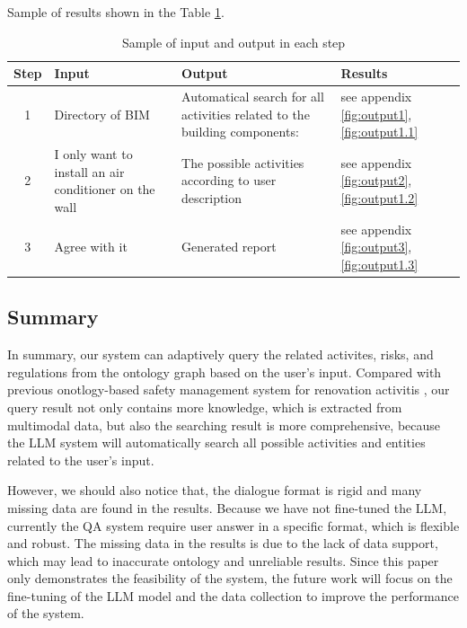 Sample of results shown in the Table  \ref{tab:input_output}.
\begin{table}
    \centering
    
    \label{tab:input_output}
    \begin{tabularx}{0.5\textwidth}{|c|X|X|X|}
        \hline
        Step & Input & Output &  Results \\
        \hline
        1 & Directory of BIM & Automatical search for all activities related to the building components: & see appendix  \ref{fig:output1}, \ref{fig:output1.1}\\
        \hline
        2 & I only want to install an air conditioner on the wall & The possible activities according to user description & see appendix \ref{fig:output2}, \ref{fig:output1.2}\\
        \hline
        3 & Agree with it & Generated report & see appendix \ref{fig:output3}, \ref{fig:output1.3} \\
        \hline
    \end{tabularx}
    \caption{Sample of input and output in each step}
\end{table}

\subsection*{Summary}
In summary, our system can adaptively query the related activites, risks, and regulations from the ontology graph based on the user's input.
Compared with previous onotlogy-based safety management system for renovation activitis \cite[]{doukari2024ontology},
our query result not only contains more knowledge, which is extracted from multimodal data, but also the searching result is more comprehensive,
because the LLM system will automatically search all possible activities and entities related to the user's input.

However, we should also notice that, the dialogue format is rigid and many missing data are found in the results. 
Because we have not fine-tuned the LLM, currently the QA system require user answer in a specific format, which is flexible and robust.
The missing data in the results is due to the lack of data support, which may lead to inaccurate ontology and unreliable results.   
Since this paper only demonstrates the feasibility of the system, the future work will focus on the fine-tuning of the LLM model and the data collection to improve the performance of the system.






